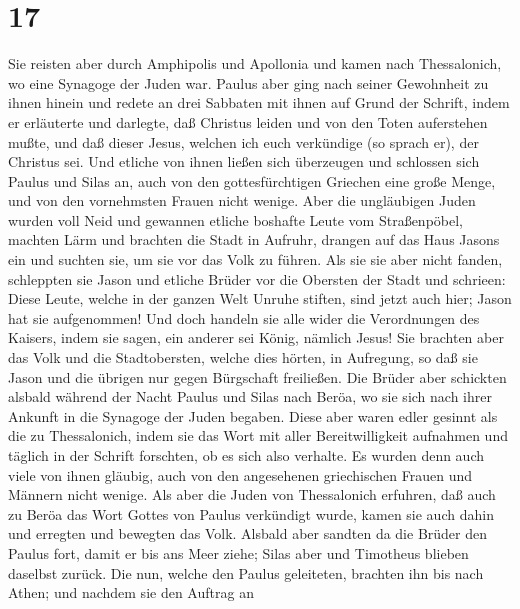 \hypertarget{section-16}{%
\section{17}\label{section-16}}

 Sie reisten aber durch Amphipolis und Apollonia und kamen
nach Thessalonich, wo eine Synagoge der Juden war.  Paulus
aber ging nach seiner Gewohnheit zu ihnen hinein und redete an drei
Sabbaten mit ihnen auf Grund der Schrift,  indem er
erläuterte und darlegte, daß Christus leiden und von den Toten
auferstehen mußte, und daß dieser Jesus, welchen ich euch verkündige (so
sprach er), der Christus sei.  Und etliche von ihnen
ließen sich überzeugen und schlossen sich Paulus und Silas an, auch von
den gottesfürchtigen Griechen eine große Menge, und von den vornehmsten
Frauen nicht wenige.  Aber die ungläubigen Juden wurden
voll Neid und gewannen etliche boshafte Leute vom Straßenpöbel, machten
Lärm und brachten die Stadt in Aufruhr, drangen auf das Haus Jasons ein
und suchten sie, um sie vor das Volk zu führen.  Als sie
sie aber nicht fanden, schleppten sie Jason und etliche Brüder vor die
Obersten der Stadt und schrieen: Diese Leute, welche in der ganzen Welt
Unruhe stiften, sind jetzt auch hier;  Jason hat sie
aufgenommen! Und doch handeln sie alle wider die Verordnungen des
Kaisers, indem sie sagen, ein anderer sei König, nämlich Jesus!
 Sie brachten aber das Volk und die Stadtobersten, welche
dies hörten, in Aufregung,  so daß sie Jason und die
übrigen nur gegen Bürgschaft freiließen.  Die Brüder aber
schickten alsbald während der Nacht Paulus und Silas nach Beröa, wo sie
sich nach ihrer Ankunft in die Synagoge der Juden begaben.
 Diese aber waren edler gesinnt als die zu Thessalonich,
indem sie das Wort mit aller Bereitwilligkeit aufnahmen und täglich in
der Schrift forschten, ob es sich also verhalte.  Es
wurden denn auch viele von ihnen gläubig, auch von den angesehenen
griechischen Frauen und Männern nicht wenige.  Als aber
die Juden von Thessalonich erfuhren, daß auch zu Beröa das Wort Gottes
von Paulus verkündigt wurde, kamen sie auch dahin und erregten und
bewegten das Volk.  Alsbald aber sandten da die Brüder
den Paulus fort, damit er bis ans Meer ziehe; Silas aber und Timotheus
blieben daselbst zurück.  Die nun, welche den Paulus
geleiteten, brachten ihn bis nach Athen; und nachdem sie den Auftrag an

